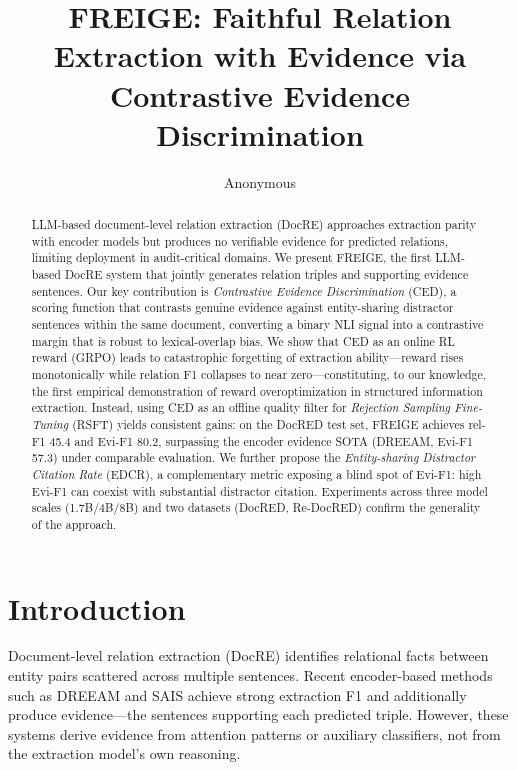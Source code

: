 \documentclass[11pt,a4paper]{article}
\title{FREIGE: Faithful Relation Extraction with Evidence via\\Contrastive Evidence Discrimination}
\author{Anonymous}
\date{}
\newcommand{\method}{FREIGE}
\newcommand{\ced}{CED}
\newcommand{\edcr}{EDCR}
\newcommand{\rsft}{RSFT}
\begin{document}
\maketitle

\begin{abstract}
LLM-based document-level relation extraction (DocRE) approaches extraction parity with encoder models but produces no verifiable evidence for predicted relations, limiting deployment in audit-critical domains.
We present \method{}, the first LLM-based DocRE system that jointly generates relation triples and supporting evidence sentences.
Our key contribution is \emph{Contrastive Evidence Discrimination} (\ced{}), a scoring function that contrasts genuine evidence against entity-sharing distractor sentences within the same document, converting a binary NLI signal into a contrastive margin that is robust to lexical-overlap bias.
We show that \ced{} as an online RL reward (GRPO) leads to catastrophic forgetting of extraction ability---reward rises monotonically while relation F1 collapses to near zero---constituting, to our knowledge, the first empirical demonstration of reward overoptimization in structured information extraction.
Instead, using \ced{} as an offline quality filter for \emph{Rejection Sampling Fine-Tuning} (\rsft{}) yields consistent gains: on the DocRED test set, \method{} achieves rel-F1 45.4 and Evi-F1 80.2, surpassing the encoder evidence SOTA (DREEAM, Evi-F1 57.3) under comparable evaluation.
We further propose the \emph{Entity-sharing Distractor Citation Rate} (\edcr{}), a complementary metric exposing a blind spot of Evi-F1: high Evi-F1 can coexist with substantial distractor citation.
Experiments across three model scales (1.7B/4B/8B) and two datasets (DocRED, Re-DocRED) confirm the generality of the approach.
\end{abstract}

\section{Introduction}

Document-level relation extraction (DocRE) identifies relational facts between entity pairs scattered across multiple sentences. Recent encoder-based methods such as DREEAM and SAIS achieve strong extraction F1 and additionally produce evidence---the sentences supporting each predicted triple. However, these systems derive evidence from attention patterns or auxiliary classifiers, not from the extraction model's own reasoning.
\end{document}
